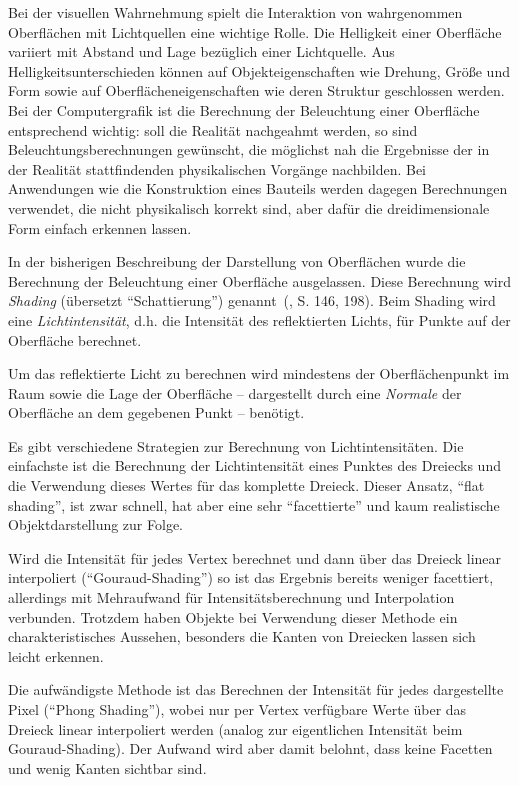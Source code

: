 \documentclass[twoside,a4paper,fleqn,12pt]{book}
\begin{document}
Bei der visuellen Wahrnehmung spielt die Interaktion von wahrgenommen Oberflächen mit Lichtquellen eine wichtige
Rolle. Die Helligkeit einer Oberfläche variiert mit Abstand und Lage bezüglich einer Lichtquelle. 
Aus Helligkeitsunterschieden können auf Objekteigenschaften wie Drehung, Größe und Form sowie auf Oberflächeneigenschaften
wie deren Struktur geschlossen werden. Bei der Computergrafik ist die Berechnung der Beleuchtung einer Oberfläche
entsprechend wichtig: soll die Realität nachgeahmt werden, so sind Beleuchtungsberechnungen gewünscht, die möglichst
nah die Ergebnisse der in der Realität stattfindenden physikalischen Vorgänge nachbilden. Bei Anwendungen wie die
Konstruktion eines Bauteils werden dagegen Berechnungen verwendet, die nicht physikalisch korrekt sind, aber dafür
die dreidimensionale Form einfach erkennen lassen.

In der bisherigen Beschreibung der Darstellung von Oberflächen wurde die Berechnung der Beleuchtung einer
Oberfläche ausgelassen. Diese Berechnung wird \emph{Shading} (übersetzt "`Schattierung"') genannt~(\cite{watt_de}, S. 146, 198).
Beim Shading wird eine \emph{Lichtintensität}, d.h. die Intensität des reflektierten Lichts, für Punkte auf der
Oberfläche berechnet.

Um das reflektierte Licht zu berechnen wird mindestens der Oberflächenpunkt im Raum sowie die Lage der Oberfläche
-- dargestellt durch eine \emph{Normale} der Oberfläche an dem gegebenen Punkt -- benötigt.

Es gibt verschiedene Strategien zur Berechnung von Lichtintensitäten. Die einfachste ist die Berechnung der Lichtintensität
eines Punktes des Dreiecks und die Verwendung dieses Wertes für das komplette Dreieck. Dieser Ansatz, ``flat shading'',
ist zwar schnell, hat aber eine sehr "`facettierte"' und kaum realistische Objektdarstellung zur Folge.

Wird die Intensität für jedes Vertex berechnet und dann über das Dreieck linear interpoliert ("`Gouraud-Shading"') so ist
das Ergebnis bereits weniger facettiert, allerdings mit Mehraufwand für Intensitätsberechnung und Interpolation verbunden.
Trotzdem haben Objekte bei Verwendung dieser Methode ein charakteristisches Aussehen, besonders die Kanten von Dreiecken lassen sich leicht erkennen.

Die aufwändigste Methode ist das Berechnen der Intensität für jedes dargestellte Pixel ("`Phong Shading"'), wobei
nur per Vertex verfügbare Werte über das Dreieck linear interpoliert werden (analog zur eigentlichen Intensität beim
Gouraud-Shading). Der Aufwand wird aber damit belohnt, dass keine Facetten und wenig Kanten sichtbar sind.
\end{document}

